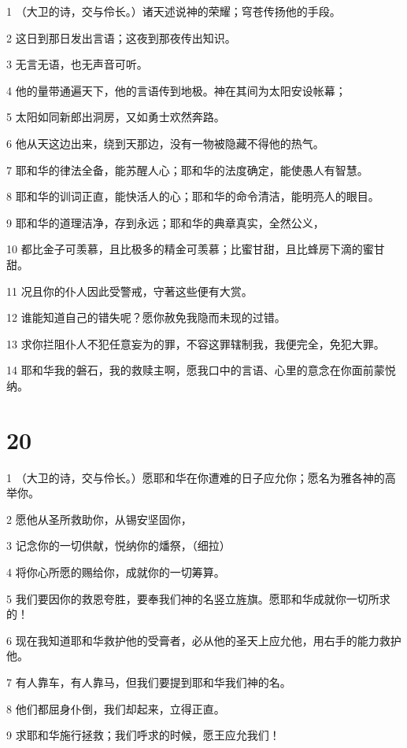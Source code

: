 \par 1 （大卫的诗，交与伶长。）诸天述说神的荣耀；穹苍传扬他的手段。
\par 2 这日到那日发出言语；这夜到那夜传出知识。
\par 3 无言无语，也无声音可听。
\par 4 他的量带通遍天下，他的言语传到地极。神在其间为太阳安设帐幕；
\par 5 太阳如同新郎出洞房，又如勇士欢然奔路。
\par 6 他从天这边出来，绕到天那边，没有一物被隐藏不得他的热气。
\par 7 耶和华的律法全备，能苏醒人心；耶和华的法度确定，能使愚人有智慧。
\par 8 耶和华的训词正直，能快活人的心；耶和华的命令清洁，能明亮人的眼目。
\par 9 耶和华的道理洁净，存到永远；耶和华的典章真实，全然公义，
\par 10 都比金子可羡慕，且比极多的精金可羡慕；比蜜甘甜，且比蜂房下滴的蜜甘甜。
\par 11 况且你的仆人因此受警戒，守著这些便有大赏。
\par 12 谁能知道自己的错失呢？愿你赦免我隐而未现的过错。
\par 13 求你拦阻仆人不犯任意妄为的罪，不容这罪辖制我，我便完全，免犯大罪。
\par 14 耶和华我的磐石，我的救赎主啊，愿我口中的言语、心里的意念在你面前蒙悦纳。

\chapter{20}

\par 1 （大卫的诗，交与伶长。）愿耶和华在你遭难的日子应允你；愿名为雅各神的高举你。
\par 2 愿他从圣所救助你，从锡安坚固你，
\par 3 记念你的一切供献，悦纳你的燔祭，（细拉）
\par 4 将你心所愿的赐给你，成就你的一切筹算。
\par 5 我们要因你的救恩夸胜，要奉我们神的名竖立旌旗。愿耶和华成就你一切所求的！
\par 6 现在我知道耶和华救护他的受膏者，必从他的圣天上应允他，用右手的能力救护他。
\par 7 有人靠车，有人靠马，但我们要提到耶和华我们神的名。
\par 8 他们都屈身仆倒，我们却起来，立得正直。
\par 9 求耶和华施行拯救；我们呼求的时候，愿王应允我们！

